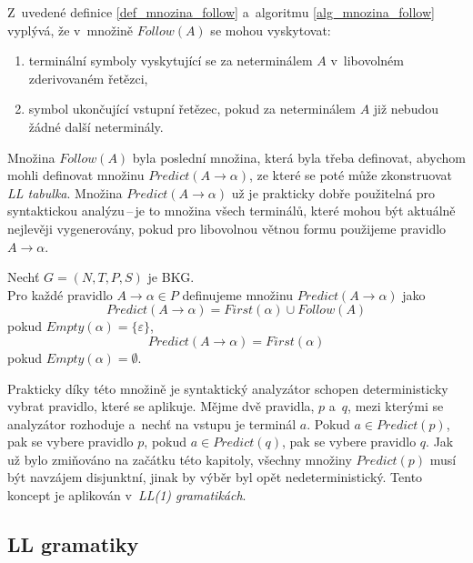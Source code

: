 Z~uvedené definice \ref{def_mnozina_follow} a~algoritmu \ref{alg_mnozina_follow} vyplývá, že v~množině $Follow(A)$ se mohou vyskytovat:
\begin{enumerate}
    \item terminální symboly vyskytující se za neterminálem $A$ v~libovolném zderivovaném řetězci,
    \item symbol ukončující vstupní řetězec, pokud za neterminálem $A$ již nebudou žádné další neterminály. 
\end{enumerate}

Množina $Follow(A)$ byla poslední množina, která byla třeba definovat, abychom mohli definovat množinu $Predict(A \rightarrow \alpha)$, ze které se poté může zkonstruovat \emph{LL tabulka}.
Množina $Predict(A \rightarrow \alpha)$ už je prakticky dobře použitelná pro syntaktickou analýzu\,--\,je to množina všech terminálů, které mohou být aktuálně nejlevěji vygenerovány, pokud pro libovolnou větnou formu použijeme pravidlo $A \rightarrow \alpha$.
\begin{definition}
    Nechť $G = (N, T, P, S)$ je BKG.\\
    Pro každé pravidlo $A \rightarrow \alpha \in P$ definujeme množinu $Predict(A \rightarrow \alpha)$ jako
    \begin{equation*}
        Predict(A \rightarrow \alpha) = First(\alpha) \cup Follow(A)
    \end{equation*}
    pokud $Empty(\alpha) = \{\varepsilon\}$,
    \begin{equation*}
        Predict(A \rightarrow \alpha) = First(\alpha)
    \end{equation*}
    pokud $Empty(\alpha) = \emptyset$.
\end{definition}
Prakticky díky této množině je syntaktický analyzátor schopen deterministicky vybrat pravidlo, které se aplikuje.
Mějme dvě pravidla, $p$ a~$q$, mezi kterými se analyzátor rozhoduje a~nechť na vstupu je terminál $a$.
Pokud $a \in Predict(p)$, pak se vybere pravidlo $p$, pokud $a \in Predict(q)$, pak se vybere pravidlo $q$.
Jak už bylo zmiňováno na začátku této kapitoly, všechny množiny $Predict(p)$ musí být navzájem disjunktní, jinak by výběr byl opět nedeterministický.
Tento koncept je aplikován v~\emph{LL(1) gramatikách}.

\subsection*{LL gramatiky}

